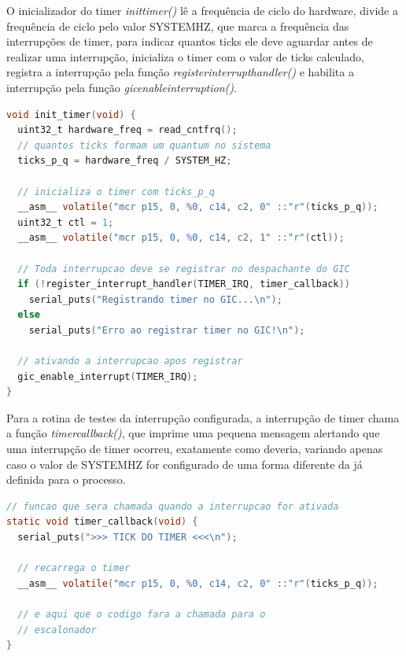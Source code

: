 O inicializador do timer \emph{init\textunderscore{}timer()} lê a frequência de ciclo do hardware, divide a frequência de ciclo pelo valor SYSTEM\textunderscore{}HZ, que marca a frequência das interrupções de timer, para indicar quantos ticks ele deve aguardar antes de realizar uma interrupção, inicializa o timer com o valor de ticks calculado, registra a interrupção pela função \emph{register\textunderscore{}interrupt\textunderscore{}handler()} e habilita a interrupção pela função \emph{gic\textunderscore{}enable\textunderscore{}interruption()}.
\begin{lstlisting}[language=C]
void init_timer(void) {
  uint32_t hardware_freq = read_cntfrq();
  // quantos ticks formam um quantum no sistema
  ticks_p_q = hardware_freq / SYSTEM_HZ;

  // inicializa o timer com ticks_p_q
  __asm__ volatile("mcr p15, 0, %0, c14, c2, 0" ::"r"(ticks_p_q));
  uint32_t ctl = 1;
  __asm__ volatile("mcr p15, 0, %0, c14, c2, 1" ::"r"(ctl));

  // Toda interrupcao deve se registrar no despachante do GIC
  if (!register_interrupt_handler(TIMER_IRQ, timer_callback))
    serial_puts("Registrando timer no GIC...\n");
  else
    serial_puts("Erro ao registrar timer no GIC!\n");

  // ativando a interrupcao apos registrar
  gic_enable_interrupt(TIMER_IRQ);
}
\end{lstlisting}
Para a rotina de testes da interrupção configurada, a interrupção de timer chama a função \emph{timer\textunderscore{}callback()}, que imprime uma pequena mensagem alertando que uma interrupção de timer ocorreu, exatamente como deveria, variando apenas caso o valor de SYSTEM\textunderscore{}HZ for configurado de uma forma diferente da já definida para o processo.
\begin{lstlisting}[language=C]
// funcao que sera chamada quando a interrupcao for ativada
static void timer_callback(void) {
  serial_puts(">>> TICK DO TIMER <<<\n");

  // recarrega o timer
  __asm__ volatile("mcr p15, 0, %0, c14, c2, 0" ::"r"(ticks_p_q));

  // e aqui que o codigo fara a chamada para o
  // escalonador
}
\end{lstlisting}
